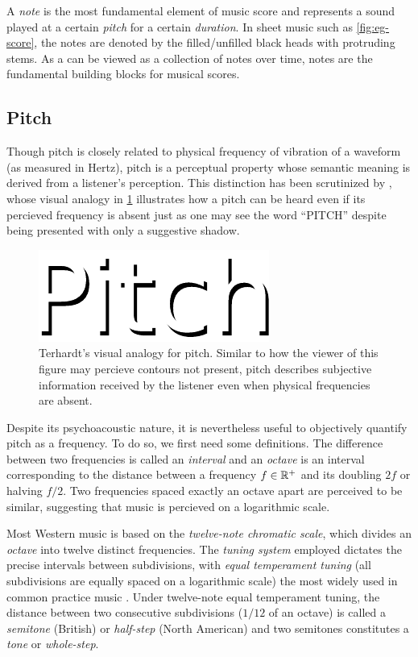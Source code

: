 A \emph{note} is the most fundamental element of music score and
represents a sound played at a certain \emph{pitch} for a certain
\emph{duration}. In sheet music such as \cref{fig:eg-score}, the notes are
denoted by the filled/unfilled black heads with protruding stems. As a can be
viewed as a collection of notes over time, notes are the fundamental building
blocks for musical scores.

\subsection{Pitch}

Though pitch is closely related to physical frequency of vibration of a
waveform (as measured in Hertz), pitch is a perceptual property whose semantic
meaning is derived from a listener's perception. This distinction has been
scrutinized by \citet{:/content/asa/journal/jasa/55/5/10.1121/1.1914648}, whose
visual analogy in \cref{fig:pitch} illustrates how a pitch can be heard even if
its percieved frequency is absent just as one may see the word ``PITCH''
despite being presented with only a suggestive shadow.

\begin{figure}[tb]
    \centering
    \includegraphics[width=0.6\linewidth]{pitch.pdf}
    \caption{Terhardt's visual analogy for pitch. Similar to how the viewer of this figure may percieve contours not present, pitch describes subjective information received by the listener even when physical frequencies are absent.}
    \label{fig:pitch}
\end{figure}

Despite its psychoacoustic nature, it is nevertheless useful to objectively
quantify pitch as a frequency. To do so, we first need some definitions. The
difference between two frequencies is called an \emph{interval} and an
\emph{octave} is an interval corresponding to the distance between a frequency
$f \in \mathbb{R}^+$ and its doubling $2f$ or halving $f/2$. Two frequencies spaced
exactly an octave apart are perceived to be similar, suggesting that music is
percieved on a logarithmic scale.

Most Western music is based on the \emph{twelve-note chromatic scale}, which
divides an \emph{octave} into twelve distinct frequencies. The \emph{tuning
system} employed dictates the precise intervals between subdivisions, with
\emph{equal temperament tuning} (all subdivisions are equally spaced on a
logarithmic scale) the most widely used in common practice music
\citep{denton1997history}. Under twelve-note equal temperament tuning, the
distance between two consecutive subdivisions ($1/12$ of an octave) is called a
\emph{semitone} (British) or \emph{half-step} (North American) and two
semitones constitutes a \emph{tone} or \emph{whole-step}.

